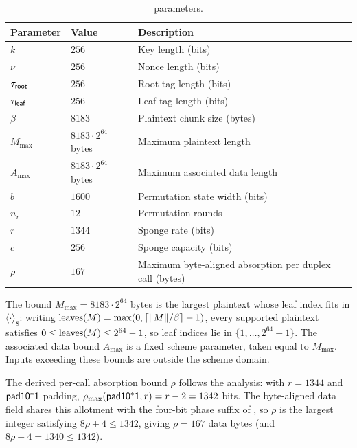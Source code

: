 \begin{table}[ht]
  \centering
  \small
  \begin{tabular}{l l l}
    \toprule
    Parameter & Value & Description \\
    \midrule
    $k$                  & $256$          & Key length (bits) \\
    $\nu$                & $256$          & Nonce length (bits) \\
    $\tau_{\mathsf{root}}$ & $256$          & Root tag length (bits) \\
    $\tau_{\mathsf{leaf}}$ & $256$          & Leaf tag length (bits) \\
    $\beta$              & $8183$         & Plaintext chunk size (bytes) \\
    $M_{\max}$           & $8183 \cdot 2^{64}$ bytes & Maximum plaintext length \\
    $A_{\max}$           & $8183 \cdot 2^{64}$ bytes & Maximum associated data length \\
    \midrule
    $b$           & $1600$  & Permutation state width (bits) \\
    $n_r$         & $12$    & Permutation rounds \\
    $r$           & $1344$  & Sponge rate (bits) \\
    $c$           & $256$   & Sponge capacity (bits) \\
    $\rho$        & $167$   & Maximum byte-aligned absorption per duplex call (bytes) \\
    \bottomrule
  \end{tabular}
  \caption{\TW{} parameters.}
  \label{tab:params}
\end{table}

The bound $M_{\max} = 8183 \cdot 2^{64}$ bytes is the largest plaintext whose leaf
index fits in $\langle \cdot \rangle_8$: writing $\operatorname{leaves}(M) =
\max(0, \lceil \|M\| / \beta \rceil - 1)$, every
supported plaintext satisfies $0 \leq \operatorname{leaves}(M) \leq 2^{64} - 1$, so
leaf indices lie in $\{1, \dots, 2^{64} - 1\}$. The associated data
bound $A_{\max}$ is a fixed scheme parameter, taken equal to
$M_{\max}$. Inputs exceeding these bounds are outside the
scheme domain.

The derived per-call absorption bound $\rho$ follows the \cite{BDPV11}
analysis: with $r = 1344$ and $\mathsf{pad10^*1}$ padding, $\rho_{\max}(\mathsf{pad10^*1}, r) =
r - 2 = 1342$ bits. The byte-aligned data field shares this allotment
with the four-bit phase suffix of , so $\rho$ is
the largest integer satisfying $8\rho + 4 \leq 1342$, giving $\rho =
167$ data bytes (and $8\rho + 4 = 1340 \leq 1342$).

